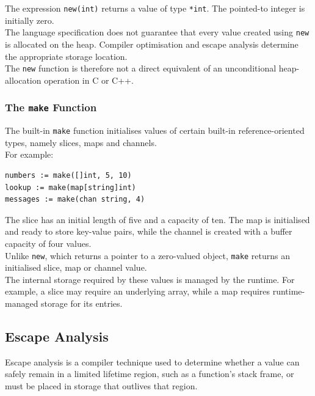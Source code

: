 The expression \texttt{new(int)} returns a value of type \texttt{*int}. The pointed-to integer is initially zero.\\

The language specification does not guarantee that every value created using \texttt{new} is allocated on the heap. Compiler optimisation and escape analysis determine the appropriate storage location.\\

The \texttt{new} function is therefore not a direct equivalent of an unconditional heap-allocation operation in C or C++.\\

\subsubsection{The \texttt{make} Function}

The built-in \texttt{make} function initialises values of certain built-in reference-oriented types, namely slices, maps and channels.\\

For example:

\begin{lstlisting}
numbers := make([]int, 5, 10)
lookup := make(map[string]int)
messages := make(chan string, 4)
\end{lstlisting}

The slice has an initial length of five and a capacity of ten. The map is initialised and ready to store key-value pairs, while the channel is created with a buffer capacity of four values.\\

Unlike \texttt{new}, which returns a pointer to a zero-valued object, \texttt{make} returns an initialised slice, map or channel value.\\

The internal storage required by these values is managed by the runtime. For example, a slice may require an underlying array, while a map requires runtime-managed storage for its entries.\\

\subsection{Escape Analysis}

Escape analysis is a compiler technique used to determine whether a value can safely remain in a limited lifetime region, such as a function's stack frame, or must be placed in storage that outlives that region.\\

